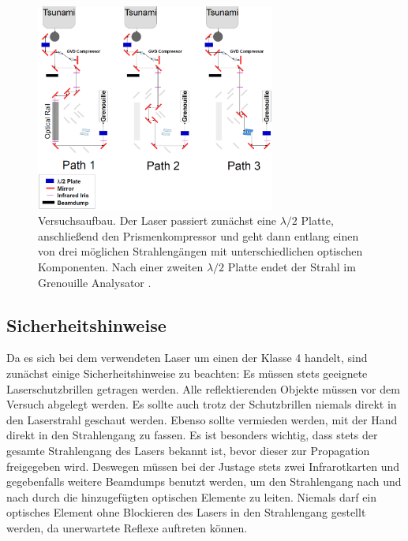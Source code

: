 \documentclass[twoside,        %
               BCOR12mm,       %
               english,ngerman, %
               fleqn,headsepline=false,footsepline=false
              ]{Vorlage/MFPREPORT}
\begin{document}
\begin{figure}[]
    \begin{center}
        \includegraphics[width=0.7\textwidth]{aufbau1.eps}
    \end{center}
    \caption{Versuchsaufbau. Der Laser passiert zunächst eine $\lambda/2$
    Platte, anschließend den Prismenkompressor und geht dann entlang einen von
    drei möglichen Strahlengängen mit unterschiedlichen optischen Komponenten.
    Nach einer zweiten $\lambda/2$ Platte endet der Strahl im Grenouille
    Analysator \cite{fprakt}.}
    \label{fig:aufbau}
\end{figure}

\subsection{Sicherheitshinweise}
Da es sich bei dem verwendeten Laser um einen der Klasse 4 handelt, sind
zunächst einige Sicherheitshinweise zu beachten: Es müssen stets geeignete
Laserschutzbrillen getragen werden. Alle reflektierenden Objekte müssen vor dem
Versuch abgelegt werden. Es sollte auch trotz der Schutzbrillen niemals direkt
in den Laserstrahl geschaut werden. Ebenso sollte vermieden werden, mit der
Hand direkt in den Strahlengang zu fassen. Es ist besonders wichtig, dass stets
der gesamte Strahlengang des Lasers bekannt ist, bevor dieser zur Propagation
freigegeben wird. Deswegen müssen bei der Justage stets zwei Infrarotkarten und
gegebenfalls weitere Beamdumps benutzt werden, um den Strahlengang nach und nach
durch die hinzugefügten optischen Elemente zu leiten. Niemals darf ein
optisches Element ohne Blockieren des Lasers in den Strahlengang gestellt
werden, da unerwartete Reflexe auftreten können.\\
\end{document}
